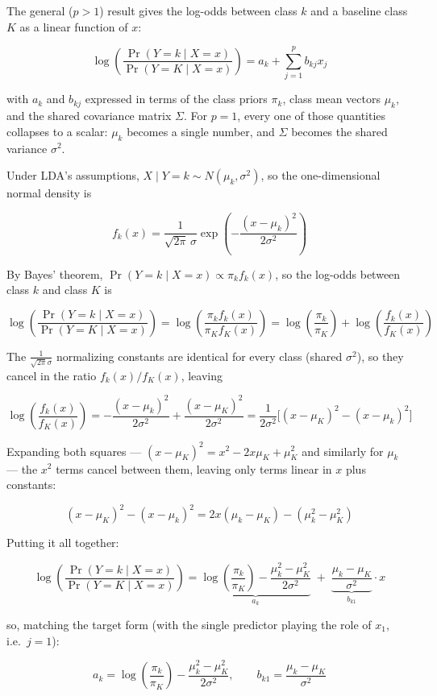 \documentclass[
  11pt,
]{article}
\begin{document}
The general (\(p > 1\)) result gives the log-odds between class \(k\)
and a baseline class \(K\) as a linear function of \(x\):

\[
\log\left(\frac{\Pr(Y=k \mid X=x)}{\Pr(Y=K \mid X=x)}\right) = a_k + \sum_{j=1}^p b_{kj} x_j
\]

with \(a_k\) and \(b_{kj}\) expressed in terms of the class priors
\(\pi_k\), class mean vectors \(\mu_k\), and the shared covariance
matrix \(\Sigma\). For \(p=1\), every one of those quantities collapses
to a scalar: \(\mu_k\) becomes a single number, and \(\Sigma\) becomes
the shared variance \(\sigma^2\).

Under LDA's assumptions, \(X \mid Y=k \sim N(\mu_k, \sigma^2)\), so the
one-dimensional normal density is

\[
f_k(x) = \frac{1}{\sqrt{2\pi}\,\sigma} \exp\left(-\frac{(x-\mu_k)^2}{2\sigma^2}\right)
\]

By Bayes' theorem, \(\Pr(Y=k\mid X=x) \propto \pi_k f_k(x)\), so the
log-odds between class \(k\) and class \(K\) is

\[
\log\left(\frac{\Pr(Y=k\mid X=x)}{\Pr(Y=K\mid X=x)}\right)
= \log\left(\frac{\pi_k f_k(x)}{\pi_K f_K(x)}\right)
= \log\left(\frac{\pi_k}{\pi_K}\right) + \log\left(\frac{f_k(x)}{f_K(x)}\right)
\]

The \(\frac{1}{\sqrt{2\pi}\sigma}\) normalizing constants are identical
for every class (shared \(\sigma^2\)), so they cancel in the ratio
\(f_k(x)/f_K(x)\), leaving

\[
\log\left(\frac{f_k(x)}{f_K(x)}\right)
= -\frac{(x-\mu_k)^2}{2\sigma^2} + \frac{(x-\mu_K)^2}{2\sigma^2}
= \frac{1}{2\sigma^2}\Big[(x-\mu_K)^2 - (x-\mu_k)^2\Big]
\]

Expanding both squares --- \((x-\mu_K)^2 = x^2 - 2x\mu_K + \mu_K^2\) and
similarly for \(\mu_k\) --- the \(x^2\) terms cancel between them,
leaving only terms linear in \(x\) plus constants:

\[
(x-\mu_K)^2 - (x-\mu_k)^2 = 2x(\mu_k - \mu_K) - (\mu_k^2 - \mu_K^2)
\]

Putting it all together:

\[
\log\left(\frac{\Pr(Y=k\mid X=x)}{\Pr(Y=K\mid X=x)}\right)
= \underbrace{\log\left(\frac{\pi_k}{\pi_K}\right) - \frac{\mu_k^2 - \mu_K^2}{2\sigma^2}}_{a_k}
\; + \; \underbrace{\frac{\mu_k - \mu_K}{\sigma^2}}_{b_{k1}} \cdot x
\]

so, matching the target form (with the single predictor playing the role
of \(x_1\), i.e.~\(j=1\)):

\[
a_k = \log\left(\frac{\pi_k}{\pi_K}\right) - \frac{\mu_k^2 - \mu_K^2}{2\sigma^2},
\qquad
b_{k1} = \frac{\mu_k - \mu_K}{\sigma^2}
\]
\end{document}
